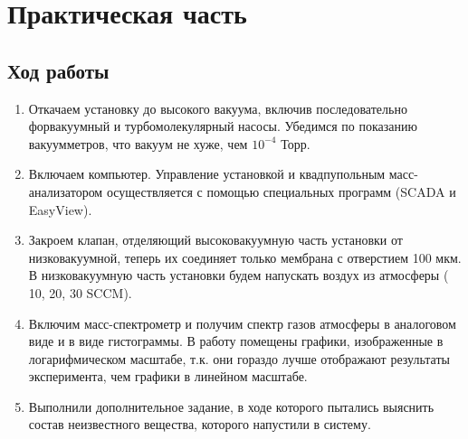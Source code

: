 \documentclass[a4paper, 12pt]{article}
\begin{document}
	\section{Практическая часть}
	\subsection{Ход работы}
	\begin{enumerate}
		\item Откачаем установку до высокого вакуума, включив последовательно форвакуумный и турбомолекулярный насосы. Убедимся по показанию вакуумметров, что вакуум не хуже, чем $10^{-4}$ Торр.
		\item Включаем компьютер. Управление установкой и квадпупольным масс-анализатором осуществляется с помощью специальных программ (SCADA и EasyView).
		\item Закроем клапан, отделяющий высоковакуумную часть установки от низковакуумной, теперь их соединяет только мембрана с отверстием 100 мкм. В низковакуумную часть установки будем напускать воздух из атмосферы ( 10, 20, 30 SCCM).
		\item Включим масс-спектрометр и получим спектр газов атмосферы в аналоговом виде  и в виде гистограммы. В работу помещены графики, изображенные в логарифмическом масштабе, т.к. они гораздо лучше отображают результаты эксперимента, чем графики в линейном масштабе.
		\item Выполнили дополнительное задание, в ходе которого пытались выяснить состав неизвестного вещества, которого напустили в систему.
	\end{enumerate}
\end{document}
